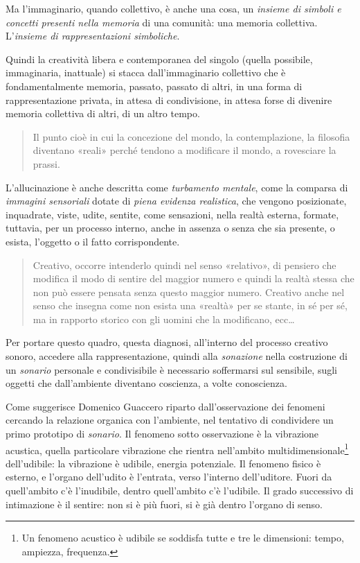 Ma l'immaginario, quando collettivo, è anche una cosa, un \emph{insieme di
simboli e concetti presenti nella memoria} di una comunità: una memoria
collettiva. L'\emph{insieme di rappresentazioni simboliche}.

Quindi la creatività libera e contemporanea \cite{agamben08} del singolo
(quella possibile, immaginaria, inattuale) si stacca dall'immaginario collettivo
che è fondamentalmente memoria, passato, passato di altri, in una forma di
rappresentazione privata, in attesa di condivisione, in attesa forse di divenire
memoria collettiva di altri, di un altro tempo.

\begin{quote}
  Il punto cioè in cui la concezione del mondo, la contemplazione, la filosofia
  diventano «reali» perché tendono a modificare il mondo, a rovesciare la prassi.
  \cite{ag:matst}
\end{quote}%

L'allucinazione è anche descritta come \emph{turbamento mentale}, come la
comparsa di \emph{immagini sensoriali} dotate di \emph{piena evidenza realistica},
che vengono posizionate, inquadrate, viste, udite, sentite, come sensazioni,
nella realtà esterna, formate, tuttavia, per un processo interno, anche in
assenza o senza che sia presente, o esista, l'oggetto o il fatto corrispondente.

\begin{quote}
  Creativo, occorre intenderlo quindi nel senso «relativo», di pensiero che
  modifica il modo di sentire del maggior numero e quindi la realtà stessa che
  non può essere pensata senza questo maggior numero. Creativo anche nel senso
  che insegna come non esista una «realtà» per se stante, in sé per sé, ma in
  rapporto storico con gli uomini che la modificano, ecc\ldots \cite{ag:matst}
\end{quote}%

Per portare questo quadro, questa diagnosi, all'interno del processo creativo
sonoro, accedere alla rappresentazione, quindi alla \emph{sonazione} nella
costruzione di un \emph{sonario} personale e condivisibile è necessario
soffermarsi sul sensibile, sugli oggetti che dall'ambiente diventano coscienza,
a volte conoscienza.

Come suggerisce Domenico Guaccero \cite{branchi1977tecnologia} riparto
dall'osservazione dei fenomeni cercando la relazione organica con
l'ambiente, nel tentativo di condividere un primo prototipo di \emph{sonario}.
Il fenomeno sotto osservazione è la vibrazione acustica, quella particolare
vibrazione che rientra nell'ambito multidimensionale\footnote{%
  Un fenomeno acustico è udibile se soddisfa tutte e tre le dimensioni: tempo,
  ampiezza, frequenza.
} dell'udibile: la vibrazione è udibile, energia potenziale. Il fenomeno fisico
è esterno, e l'organo dell'udito è l'entrata, verso l'interno dell'uditore.
Fuori da quell'ambito c'è l'inudibile, dentro quell'ambito c'è l'udibile. Il
grado successivo di intimazione è il sentire: non si è più fuori, si è già
dentro l'organo di senso.

